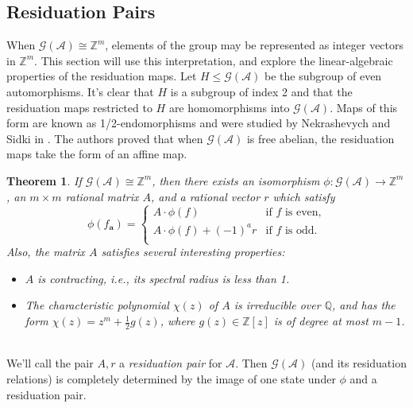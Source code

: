 \documentclass[12pt, letterpaper]{article}
\newcommand{\Z}{\mathbb Z}
\newcommand{\Q}{\mathbb Q}
\newcommand{\A}{\mathcal A}
\newcommand{\ch}[1]{\mathbf{#1}}
\newcommand{\res}[2]{{{#1}_{\ch{#2}}}}
\newcommand{\gp}{\mathcal G}
\newtheorem{thm}{Theorem}[section]
\begin{document}
\subsection{Residuation Pairs}\label{sec:matrix_rep}
When $\gp(\A) \cong \Z^m$, elements of the group may be represented as integer
vectors in $\Z^m$. This section will use this interpretation, and explore the
linear-algebraic properties of the residuation maps.  Let $H \le \gp(\A)$ be
the subgroup of even automorphisms. It's clear that $H$ is a subgroup of index
2 and that the residuation maps restricted to $H$ are homomorphisms into
$\gp(\A)$. Maps of this form are known as 1/2-endomorphisms and were studied by
Nekrashevych and Sidki in \cite{nekrashevych2004automorphisms}. The authors
proved that when $\gp(\A)$ is free abelian, the residuation maps take the form
of an affine map.
\begin{thm}\label{thm:nekrashevych_sidki}
    If $\gp(\A) \cong \Z^m$, then there exists an isomorphism $\phi : \gp(\A)
    \rightarrow \Z^m$, an $m \times m$ rational matrix $A$, and a rational
    vector $r$ which satisfy
    \begin{equation}\label{eq:Aresiduals}
        \phi(\res{f}{a}) = \begin{cases}
            A \cdot \phi(f) & \text{if $f$ is even,}\\
            A \cdot \phi(f) + (-1)^a r &
            \text{if $f$ is odd.}\\
        \end{cases}
    \end{equation}
    Also, the matrix $A$ satisfies several interesting properties:
    \begin{itemize}
        \item $A$ is contracting, i.e., its spectral radius is less than 1.
        \item The characteristic polynomial $\chi(z)$ of $A$ is irreducible
            over $\Q$, and has the form $\chi(z) = z^m + \frac{1}{2}g(z)$,
            where $g(z) \in \Z[z]$ is of degree at most $m-1$.
    \end{itemize}
\end{thm}\hfill\\
We'll call the pair $A, r$ a \emph{residuation pair} for $\A$.  Then $\gp(\A)$
(and its residuation relations) is completely determined by the image of one
state under $\phi$ and a residuation pair.
\end{document}
